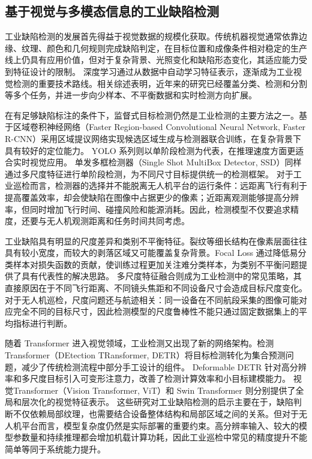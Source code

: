 \subsection{基于视觉与多模态信息的工业缺陷检测}

工业缺陷检测的发展首先得益于视觉数据的规模化获取。传统机器视觉通常依靠边缘、纹理、颜色和几何规则完成缺陷判定，在目标位置和成像条件相对稳定的生产线上仍具有应用价值，但对于复杂背景、光照变化和缺陷形态变化，其适应能力受到特征设计的限制\cite{Diers2023IJCVIQC,Li2024SurfaceDefectReview}。 深度学习通过从数据中自动学习特征表示，逐渐成为工业视觉检测的重要技术路线。相关综述表明，近年来的研究已经覆盖分类、检测和分割等多个任务，并进一步向少样本、不平衡数据和实时检测方向扩展\cite{Taox2021Survey,Diers2023IJCVIQC,Li2024SurfaceDefectReview}。

在有足够缺陷标注的条件下，监督式目标检测仍然是工业检测的主要方法之一。基于区域卷积神经网络（Faster Region-based Convolutional Neural Network, Faster R-CNN）采用区域提议网络实现候选区域生成与检测器联合训练，在复杂背景下具有较好的定位能力\cite{Ren2017FasterRCNN}。 YOLO 系列则以单阶段检测为代表，在推理速度方面更适合实时视觉应用\cite{Redmon2016YOLO,Redmon2018YOLOv3,Bochkovskiy2020YOLOv4,tan2024sccmdet,yi2025uavtransmission}。 单发多框检测器（Single Shot MultiBox Detector, SSD）同样通过多尺度特征进行单阶段检测，为不同尺寸目标提供统一的检测框架\cite{Liu2016SSD}。 对于工业巡检而言，检测器的选择并不能脱离无人机平台的运行条件：远距离飞行有利于提高覆盖效率，却会使缺陷在图像中占据更少的像素；近距离观测能够提高分辨率，但同时增加飞行时间、碰撞风险和能源消耗。因此，检测模型不仅要追求精度，还要与无人机观测距离和任务时间共同考虑。

工业缺陷具有明显的尺度差异和类别不平衡特征。裂纹等细长结构在像素层面往往具有较小宽度，而较大的剥落区域又可能覆盖复杂背景。Focal Loss 通过降低易分类样本对损失函数的贡献，使训练过程更加关注难分类样本，为类别不平衡问题提供了具有代表性的解决思路\cite{Lin2020Focal}。 多尺度特征融合则成为工业检测中的常见策略，其直接原因在于不同飞行距离、不同镜头焦距和不同设备尺寸会造成目标尺度变化。对于无人机巡检，尺度问题还与航迹相关：同一设备在不同航段采集的图像可能对应完全不同的目标尺寸，因此检测模型的尺度鲁棒性不能只通过固定数据集上的平均指标进行判断。

随着 Transformer 进入视觉领域，工业检测又出现了新的网络架构。检测Transformer（DEtection TRansformer, DETR）将目标检测转化为集合预测问题，减少了传统检测流程中部分手工设计的组件\cite{Carion2020DETR}。 Deformable DETR 针对高分辨率和多尺度目标引入可变形注意力，改善了检测计算效率和小目标建模能力\cite{Zhu2021DeformableDETR}。 视觉Transformer（Vision Transformer, ViT）和 Swin Transformer 则分别提供了全局和层次化的视觉特征表示\cite{Dosovitskiy2021ViT,Liu2021Swin}。 这些研究对工业缺陷检测的启示主要在于，缺陷判断不仅依赖局部纹理，也需要结合设备整体结构和局部区域之间的关系。但对于无人机平台而言，模型复杂度仍然是实际部署的重要约束。高分辨率输入、较大的模型参数量和持续推理都会增加机载计算功耗，因此工业巡检中常见的精度提升不能简单等同于系统能力提升。

